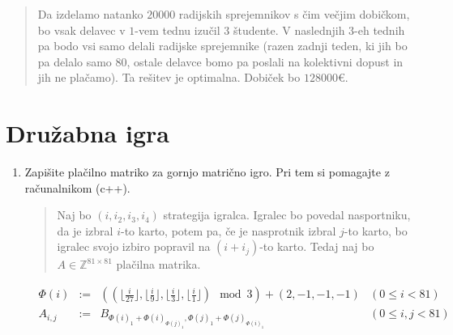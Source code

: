\documentclass{article}
\newcommand{\euro}{\text{€}}
\begin{document}
\begin{enumerate}[label=\alph*)]
    \begin{quote} 
    Da izdelamo natanko $20000$ radijskih sprejemnikov s čim večjim dobičkom, bo vsak delavec v $1$-vem tednu izučil $3$ študente. V naslednjih $3$-eh tednih pa bodo vsi samo delali radijske sprejemnike (razen zadnji teden, ki jih bo pa delalo samo $80$, ostale delavce bomo pa poslali na kolektivni dopust in jih ne plačamo). Ta rešitev je optimalna.
    Dobiček bo $128000\euro$.
    \end{quote}
    
\end{enumerate}

\section{Družabna igra}

\begin{enumerate}[label=\alph*)]
\item Zapišite plačilno matriko za gornjo matrično igro. Pri tem si pomagajte z računalnikom (c++).
    \begin{quote} 
    Naj bo $(i,i_2,i_3,i_4)$ strategija igralca. Igralec bo povedal nasportniku, da je izbral
    $i$-to karto, potem pa, če je nasprotnik izbral $j$-to karto, bo igralec svojo izbiro popravil
    na $(i+i_j)$-to karto. Tedaj naj bo $A \in \mathbb{Z}^{81 \times 81}$ plačilna matrika.
    \end{quote}
    $$
        \begin{array}{lllll}
            & \Phi(i) & := & ((\lfloor \frac{i}{27} \rfloor, 
                              \lfloor \frac{i}{9} \rfloor,
                              \lfloor \frac{i}{3} \rfloor,
                              \lfloor \frac{i}{1} \rfloor) \mod 3 )+ (2,-1,-1,-1) & (0 \leq i < 81)\\
            & A_{i,j} & := & B_{\Phi(i)_1 + \Phi(i)_{\Phi(j)_1}, \Phi(j)_1 + \Phi(j)_{\Phi(i)_1}} & (0 \leq i,j < 81) \\
        \end{array}
    $$
    

\end{enumerate}
\end{document}
